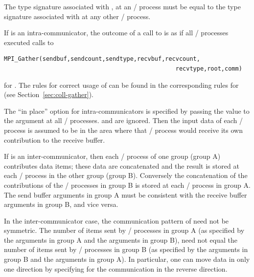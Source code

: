 The type signature associated with ,
at an \MPI/ process must be equal to the type signature associated with
 at any other \MPI/ process.

If  is an intra-communicator,
the outcome of a call to  is as if
all \MPI/ processes executed  calls to
\begin{lstlisting}[language={[MPI]C}]
   MPI_Gather(sendbuf,sendcount,sendtype,recvbuf,recvcount,
                                                 recvtype,root,comm)
\end{lstlisting}
for .  The rules for correct usage of
 can be found in the corresponding rules
for  (see Section~\ref{sec:coll-gather}).

The ``in place'' option  for intra-communicators is specified by passing the
value
 to the argument  at all \MPI/ processes.
 and  are ignored.  Then the input data
of each \MPI/ process is assumed to be in the area where that
\MPI/ process would receive its own contribution to the receive
buffer.

If  is an inter-communicator, then each \MPI/ process
of one group (group A) contributes  data items; these
data are concatenated and the result
is stored at each \MPI/ process in the other
group (group B).  Conversely the concatenation of the
contributions of the \MPI/ processes in group B is stored at each \MPI/ process in
group A.   The send buffer arguments in group A must be consistent
with the receive buffer arguments in group B, and vice versa.

\begin{users}
In the inter-communicator case, the communication pattern of 
need not be symmetric.  The number of items
sent by \MPI/ processes in group A (as specified by the arguments
 in group A and the arguments
 in group B), need not equal the number of
items sent by \MPI/ processes in group B (as specified by the arguments
 in group B and the arguments
 in group A).  In particular, one can move
data in only one direction by specifying  for
the communication in the reverse direction.
\end{users}

